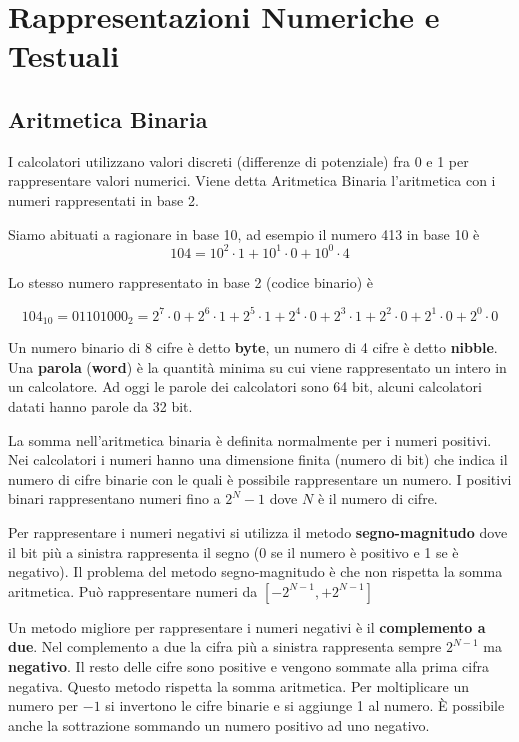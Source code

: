 \chapter{Rappresentazioni Numeriche e Testuali}

\section{Aritmetica Binaria}

I calcolatori utilizzano valori discreti (differenze di potenziale) fra 0 e 1 per rappresentare valori numerici. Viene detta Aritmetica Binaria l'aritmetica con i numeri rappresentati in base 2.

Siamo abituati a ragionare in base 10, ad esempio il numero 413 in base 10 è 
\[ 104 = 10^2 \cdot 1 + 10^1 \cdot 0 + 10^0 \cdot 4 \]

Lo stesso numero rappresentato in base 2 (codice binario) è

\[ 104_{10} = 01101000_2 = 2^7 \cdot 0 + 2^6 \cdot 1 + 2^5 \cdot 1 + 2^4 \cdot 0 + 2^3 \cdot 1 + 2^2 \cdot 0 + 2^1 \cdot 0 + 2^0 \cdot 0 \]

Un numero binario di 8 cifre è detto \textbf{byte}, un numero di 4 cifre è detto \textbf{nibble}. Una \textbf{parola} (\textbf{word}) è la quantità minima su cui viene rappresentato un intero in un calcolatore. Ad oggi le parole dei calcolatori sono 64 bit, alcuni calcolatori datati hanno parole da 32 bit.

La somma nell'aritmetica binaria è definita normalmente per i numeri positivi. Nei calcolatori i numeri hanno una dimensione finita (numero di bit) che indica il numero di cifre binarie con le quali è possibile rappresentare un numero. I positivi binari rappresentano numeri fino a $ 2^{N}-1 $ dove $ N $ è il numero di cifre.

Per rappresentare i numeri negativi si utilizza il metodo \textbf{segno-magnitudo} dove il bit più a sinistra rappresenta il segno (0 se il numero è positivo e 1 se è negativo). Il problema del metodo segno-magnitudo è che non rispetta la somma aritmetica. Può rappresentare numeri da $ [-2^{N-1}, +2^{N-1} ] $

Un metodo migliore per rappresentare i numeri negativi è il \textbf{complemento a due}. Nel complemento a due la cifra più a sinistra rappresenta sempre $ 2^{N-1} $ ma \textbf{negativo}. Il resto delle cifre sono positive e vengono sommate alla prima cifra negativa. Questo metodo rispetta la somma aritmetica. Per moltiplicare un numero per $ -1 $ si invertono le cifre binarie e si aggiunge 1 al numero. È possibile anche la sottrazione sommando un numero positivo ad uno negativo.

